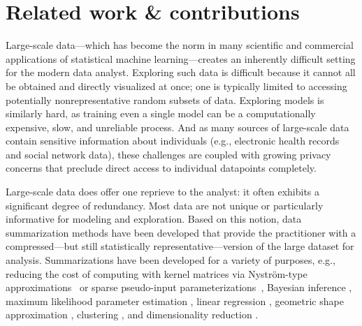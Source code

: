 \section{Related work \& contributions}
\label{sec:intro}

Large-scale data---which has become the norm in many scientific and commercial applications of statistical machine learning---creates
an inherently difficult setting for the modern data analyst. Exploring such data is difficult because it cannot all be
obtained and directly visualized at once; one is typically limited to accessing potentially nonrepresentative random subsets of data.
Exploring models is similarly hard, as training even a single model can be a computationally expensive, slow, and unreliable process.
And as many sources of large-scale data contain sensitive information about 
individuals (e.g., electronic health records and social network data),
these challenges are coupled with growing privacy concerns  that preclude direct access to individual datapoints completely. 

Large-scale data does offer one reprieve to the analyst: it often exhibits a significant degree of redundancy. Most data are 
not unique or particularly informative for modeling and exploration. Based on this notion, data summarization methods have been developed  
that provide the practitioner with a compressed---but still statistically representative---version of the large dataset for analysis.
Summarizations have been developed for a variety of purposes, e.g., reducing the cost of computing with kernel matrices via Nystr{\"o}m-type approximations~\citep{drineas05,musco17,agrawal19} or sparse pseudo-input parameterizations~\citep{snelson05},
Bayesian inference \citep{huggins16,huggins17,campbell18,campbell19jmlr}, maximum likelihood 
parameter estimation \citep{dumouchel99,madigan02}, 
linear regression \citep{zhou08,guhaniyogi15},
geometric shape approximation \citep{agarwal05},
clustering \citep{feldman11,lucic16,bachem15,braverman16}, and dimensionality reduction \citep{feldman16}.


